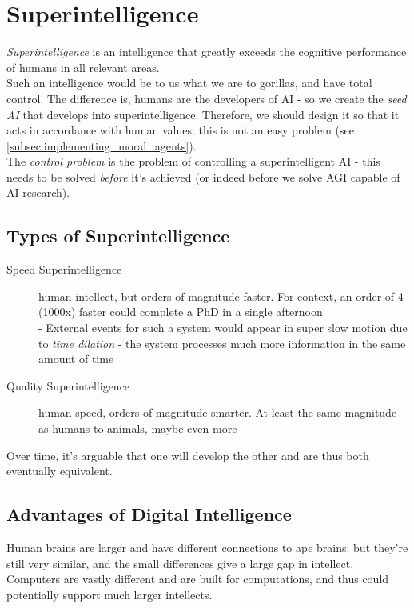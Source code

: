 \section{Superintelligence}
\emph{Superintelligence} is an intelligence that greatly exceeds the cognitive performance of humans in all relevant areas.\\
Such an intelligence would be to us what we are to gorillas, and have total control. The difference is, humans are the developers of AI - so we create the \emph{seed AI} that develops into superintelligence. Therefore, we should design it so that it acts in accordance with human values: this is not an easy problem (see \ref{subsec:implementing_moral_agents}). \\
The \emph{control problem} is the problem of controlling a superintelligent AI - this needs to be solved \emph{before} it's achieved (or indeed before we solve AGI capable of AI research).

\subsection{Types of Superintelligence}
\begin{description}
    \item[Speed Superintelligence] human intellect, but orders of magnitude faster. For context, an order of 4 (1000x) faster  could complete a PhD in a single afternoon\\
    \quad - External events for such a system would appear in super slow motion due to \emph{time dilation} - the system processes much more information in the same amount of time
    \item[Quality Superintelligence] human speed, orders of magnitude smarter. At least the same magnitude as humans to animals, maybe even more 
\end{description}
Over time, it's arguable that one will develop the other and are thus both eventually equivalent.

\subsection{Advantages of Digital Intelligence}
Human brains are larger and have different connections to ape brains: but they're still very similar, and the small differences give a large gap in intellect. Computers are vastly different and are built for computations, and thus could potentially support much larger intellects.

